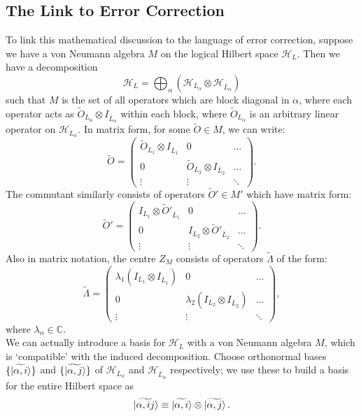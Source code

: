 \documentclass[12pt,a4paper]{report}
\numberwithin{equation}{section}
\newcommand{\ol}[1]{\overline{#1}}
\theoremstyle{definition}
\theoremstyle{theorem}
\theoremstyle{theorem}
\theoremstyle{example}
\theoremstyle{definition}
\begin{document}
\subsection{The Link to Error Correction}
To link this mathematical discussion to the language of error correction, suppose we have a von Neumann algebra $M$ on the logical Hilbert space $\mathcal{H}_{L}$. Then we have a decomposition
\begin{equation}\label{decomp}
	\mathcal{H}_{L}=\bigoplus_{\alpha}(\mathcal{H}_{L_{\alpha}}\otimes\mathcal{H}_{\ol{L}_{\alpha}})
\end{equation} 
such that $M$ is the set of all operators which are block diagonal in $\alpha$, where each operator acts as $\tilde{O}_{L_{\alpha}}\otimes I_{\ol{L}_{\alpha}}$ within each block, where $\tilde{O}_{L_{\alpha}}$ is an arbitrary linear operator on $\mathcal{H}_{L_{\alpha}}$. In matrix form, for some $\tilde{O}\in M$, we can write:
\begin{equation}\label{thing1}
	\tilde{O}=\begin{pmatrix}
		\tilde{O}_{L_{1}}\otimes I_{\ol{L}_{1}}&0&\dots\\
		0&\tilde{O}_{L_{2}}\otimes I_{\ol{L}_{2}}&\dots\\
		\vdots&\vdots&\ddots
	\end{pmatrix}.
\end{equation}
The commutant similarly consists of operators $\tilde{O}'\in M'$ which have matrix form:
\begin{equation}
	\tilde{O}'=\begin{pmatrix}
		I_{L_{1}}\otimes\tilde{O}'_{\ol{L}_{1}}&0&\dots\\
		0&I_{L_{2}}\otimes\tilde{O}'_{\ol{L}_{2}}&\dots\\
		\vdots&\vdots&\ddots
	\end{pmatrix}.
\end{equation}
Also in matrix notation, the centre $Z_{M}$ consists of operators $\tilde{\Lambda}$ of the form:
\begin{equation}
	\tilde{\Lambda}=\begin{pmatrix}
		\lambda_{1}(I_{L_{1}}\otimes I_{\ol{L}_{1}})&0&\dots\\
		0&\lambda_{2}(I_{L_{2}}\otimes I_{\ol{L}_{2}})&\dots\\
		\vdots&\vdots&\ddots
	\end{pmatrix},
\end{equation}
where $\lambda_{\alpha}\in\mathbb{C}$.\\
We can actually introduce a basis for $\mathcal{H}_{L}$ with a von Neumann algebra $M$, which is `compatible' with the induced decomposition. Choose orthonormal bases $\{\ket{\widetilde{\alpha,i}}\}$ and $\{\ket{\widetilde{\alpha,j}}\}$ of $\mathcal{H}_{L_{\alpha}}$ and $\mathcal{H}_{\ol{L}_{\alpha}}$ respectively; we use these to build a basis for the entire Hilbert space as
\begin{equation}\label{basis}
	\ket{\widetilde{\alpha,ij}}\equiv\ket{\widetilde{\alpha,i}}\otimes\ket{\widetilde{\alpha,j}}.
\end{equation}
\end{document}
